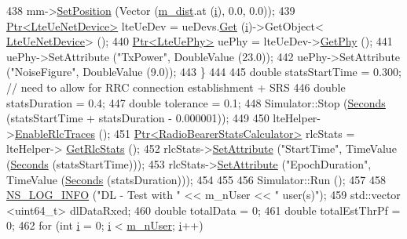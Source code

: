 \begin{DoxyCode}
438       mm->\hyperlink{classns3_1_1MobilityModel_ac584b3d5a309709d2f13ed6ada1e7640}{SetPosition} (Vector (\hyperlink{classLenaPfFfMacSchedulerTestCase2_a3a24b311686a784d71b6b0ca3de77e2e}{m\_dist}.at (\hyperlink{bernuolliDistribution_8m_a6f6ccfcf58b31cb6412107d9d5281426}{i}), 0.0, 0.0));
439       \hyperlink{classns3_1_1Ptr}{Ptr<LteUeNetDevice>} lteUeDev = ueDevs.\hyperlink{classns3_1_1NetDeviceContainer_a677d62594b5c9d2dea155cc5045f4d0b}{Get} (\hyperlink{bernuolliDistribution_8m_a6f6ccfcf58b31cb6412107d9d5281426}{i})->GetObject<
      \hyperlink{classns3_1_1LteUeNetDevice}{LteUeNetDevice}> ();
440       \hyperlink{classns3_1_1Ptr}{Ptr<LteUePhy>} uePhy = lteUeDev->\hyperlink{classns3_1_1LteUeNetDevice_a2a9940a1e457a8bf3dae87fed4199c7a}{GetPhy} ();
441       uePhy->SetAttribute (\textcolor{stringliteral}{"TxPower"}, DoubleValue (23.0));
442       uePhy->SetAttribute (\textcolor{stringliteral}{"NoiseFigure"}, DoubleValue (9.0));
443     \}
444 
445   \textcolor{keywordtype}{double} statsStartTime = 0.300; \textcolor{comment}{// need to allow for RRC connection establishment + SRS}
446   \textcolor{keywordtype}{double} statsDuration = 0.4;
447   \textcolor{keywordtype}{double} tolerance = 0.1;
448   Simulator::Stop (\hyperlink{group__timecivil_ga33c34b816f8ff6628e33d5c8e9713b9e}{Seconds} (statsStartTime + statsDuration - 0.000001));
449 
450   lteHelper->\hyperlink{classns3_1_1LteHelper_abadfdd04d30b261e9b6f0846b4784928}{EnableRlcTraces} ();
451   \hyperlink{classns3_1_1Ptr}{Ptr<RadioBearerStatsCalculator>} rlcStats = lteHelper->
      \hyperlink{classns3_1_1LteHelper_a6eb438ccf69642e3863adea4991fa2ca}{GetRlcStats} ();
452   rlcStats->\hyperlink{classns3_1_1ObjectBase_ac60245d3ea4123bbc9b1d391f1f6592f}{SetAttribute} (\textcolor{stringliteral}{"StartTime"}, TimeValue (\hyperlink{group__timecivil_ga33c34b816f8ff6628e33d5c8e9713b9e}{Seconds} (statsStartTime)));
453   rlcStats->\hyperlink{classns3_1_1ObjectBase_ac60245d3ea4123bbc9b1d391f1f6592f}{SetAttribute} (\textcolor{stringliteral}{"EpochDuration"}, TimeValue (\hyperlink{group__timecivil_ga33c34b816f8ff6628e33d5c8e9713b9e}{Seconds} (statsDuration)));
454 
455 
456   Simulator::Run ();
457 
458   \hyperlink{group__logging_gafbd73ee2cf9f26b319f49086d8e860fb}{NS\_LOG\_INFO} (\textcolor{stringliteral}{"DL - Test with "} << m\_nUser << \textcolor{stringliteral}{" user(s)"});
459   std::vector <uint64\_t> dlDataRxed;
460   \textcolor{keywordtype}{double} totalData = 0;
461   \textcolor{keywordtype}{double} totalEstThrPf = 0;
462   \textcolor{keywordflow}{for} (\textcolor{keywordtype}{int} \hyperlink{bernuolliDistribution_8m_a6f6ccfcf58b31cb6412107d9d5281426}{i} = 0; \hyperlink{bernuolliDistribution_8m_a6f6ccfcf58b31cb6412107d9d5281426}{i} < \hyperlink{classLenaPfFfMacSchedulerTestCase2_a48ae704964f6973d4c7a957cb7d673da}{m\_nUser}; \hyperlink{bernuolliDistribution_8m_a6f6ccfcf58b31cb6412107d9d5281426}{i}++)

\end{DoxyCode}
